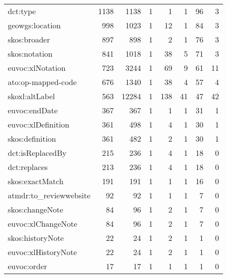 \documentclass[10pt,a4paper,titlepage,final]{article}
\begin{document}
\begin{longtable}{lrrrrrrr}
               dct:type &        1138 &     1138 &    1 &    1 &    1 &          96 &        3 \\
        geowgs:location &         998 &     1023 &    1 &   12 &    1 &          84 &        3 \\
           skos:broader &         897 &      898 &    1 &    2 &    1 &          76 &        3 \\
          skos:notation &         841 &     1018 &    1 &   38 &    5 &          71 &        3 \\
       euvoc:xlNotation &         723 &     3244 &    1 &   69 &    9 &          61 &       11 \\
     ato:op-mapped-code &         676 &     1340 &    1 &   38 &    4 &          57 &        4 \\
         skoxl:altLabel &         563 &    12284 &    1 &  138 &   41 &          47 &       42 \\
          euvoc:endDate &         367 &      367 &    1 &    1 &    1 &          31 &        1 \\
     euvoc:xlDefinition &         361 &      498 &    1 &    4 &    1 &          30 &        1 \\
        skos:definition &         361 &      482 &    1 &    2 &    1 &          30 &        1 \\
       dct:isReplacedBy &         215 &      236 &    1 &    4 &    1 &          18 &        0 \\
           dct:replaces &         213 &      236 &    1 &    4 &    1 &          18 &        0 \\
        skos:exactMatch &         191 &      191 &    1 &    1 &    1 &          16 &        0 \\
 atmdr:to\_reviewwebsite &          92 &       92 &    1 &    1 &    1 &           7 &        0 \\
        skos:changeNote &          84 &       96 &    1 &    2 &    1 &           7 &        0 \\
     euvoc:xlChangeNote &          84 &       96 &    1 &    2 &    1 &           7 &        0 \\
       skos:historyNote &          22 &       24 &    1 &    2 &    1 &           1 &        0 \\
    euvoc:xlHistoryNote &          22 &       24 &    1 &    2 &    1 &           1 &        0 \\
            euvoc:order &          17 &       17 &    1 &    1 &    1 &           1 &        0 \\

\end{longtable}
\end{document}
